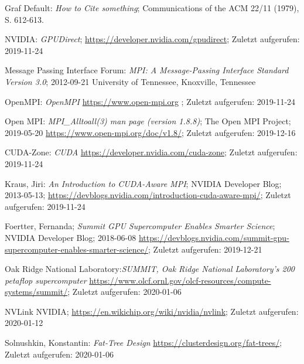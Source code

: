         Graf Default: {\sl How to Cite something}; 
        Communications of the ACM 22/11 (1979), S. 612-613.

		NVIDIA: {\sl GPUDirect};
		\url{https://developer.nvidia.com/gpudirect}; Zuletzt aufgerufen: 2019-11-24


		Message Passing Interface Forum: {\sl MPI: A Message-Passing Interface Standard Version 3.0}; 2012-09-21
		University of Tennessee, Knoxville, Tennessee

		OpenMPI: {\sl OpenMPI}
		\url{https://www.open-mpi.org} ; Zuletzt aufgerufen: 2019-11-24

		Open MPI: {\sl MPI\_Alltoall(3) man page (version 1.8.8)};
		The Open MPI Project; 2019-05-20
		\url {https://www.open-mpi.org/doc/v1.8/}; Zuletzt aufgerufen: 2019-12-16

		CUDA-Zone: {\sl CUDA}
		\url{https://developer.nvidia.com/cuda-zone}; Zuletzt aufgerufen: 2019-11-24

		Kraus, Jiri: {\sl An Introduction to CUDA-Aware MPI};
		NVIDIA Developer Blog; 2013-05-13;	
		\url{https://devblogs.nvidia.com/introduction-cuda-aware-mpi/}; Zuletzt aufgerufen: 2019-11-24

		Foertter, Fernanda; {\sl Summit GPU Supercomputer Enables Smarter Science}; NVIDIA Developer Blog; 2018-06-08
		\url{https://devblogs.nvidia.com/summit-gpu-supercomputer-enables-smarter-science/}; Zuletzt aufgerufen: 2019-12-21

		Oak Ridge National Laboratory:{\sl SUMMIT, Oak Ridge National Laboratory's 200 petaflop supercomputer}
		\url{https://www.olcf.ornl.gov/olcf-resources/compute-systems/summit/}; Zuletzt aufgerufen: 2020-01-06

	NVLink NVIDIA;
	\url{https://en.wikichip.org/wiki/nvidia/nvlink}; Zuletzt aufgerufen: 2020-01-12

		Solnushkin, Konstantin: {\sl Fat-Tree Design}
		\url{https://clusterdesign.org/fat-trees/}; Zuletzt aufgerufen: 2020-01-06
